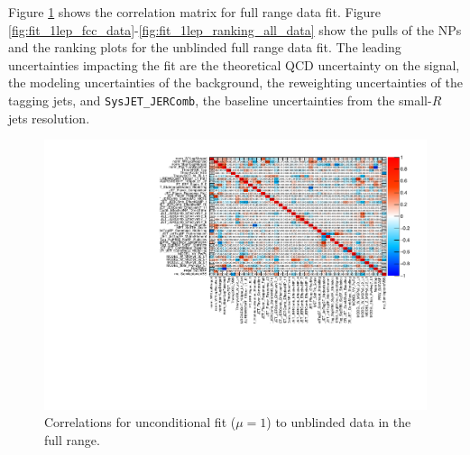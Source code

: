Figure \ref{fig:fit_1lep_corr_all_data} shows the correlation matrix for full range data fit.
Figure \ref{fig:fit_1lep_fcc_data}-\ref{fig:fit_1lep_ranking_all_data} show the pulls of the NPs and the ranking plots for the unblinded full range data fit. 
The leading uncertainties impacting the fit are the theoretical QCD uncertainty on the signal, 
the modeling uncertainties of the \Wjets background,
the reweighting uncertainties of the tagging jets, 
and \texttt{SysJET\_JERComb}, the baseline uncertainties from the small-$R$ jets resolution.


\begin{figure}[ht]
      \centering
        \includegraphics[width=\linewidth]{figures/Fit_fcc/GlobalFit/corr_HighCorrNoMCStat.pdf}
        \caption{Correlations for unconditional fit ($\mu=1$) to unblinded data in the full range.}
       \label{fig:fit_1lep_corr_all_data}
\end{figure}

